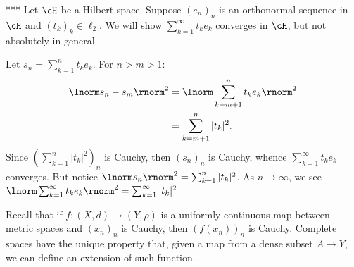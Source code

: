     \begin{example}***
        Let $\cH$ be a Hilbert space. Suppose $(e_n)_n$ is an orthonormal sequence in $\cH$ and $(t_k)_k \in \ell_2$. We will show $\sum_{k = 1}^\infty t_k e_k$ converges in $\cH$, but not absolutely in general.

        Let $s_n = \sum_{k = 1}^n t_k e_k$. For $n>m > 1$:
            \begin{equation*}
            \begin{split}
                \lnorm s_n - s_m \rnorm^2 
                & = \lnorm \sum_{k = m+1}^n t_k e_k \rnorm^2 \\
                & = \sum_{k = m+1}^n |t_k|^2.
            \end{split}
            \end{equation*}
        Since $ \left( \sum_{k = 1}^n |t_k|^2 \right)_n$ is Cauchy, then $(s_n)_n$ is Cauchy, whence $\sum_{k = 1}^\infty t_k e_k$ converges. But notice $\lnorm s_n \rnorm^2 = \sum_{k = 1}^n |t_k|^2$. As $n \rightarrow \infty$, we see $\lnorm \sum_{k = 1}^\infty t_k e_k \rnorm^2 = \sum_{k = 1}^\infty |t_k|^2$.
    \end{example}

    \begin{center}
    \end{center}

    Recall that if $f:(X,d) \rightarrow (Y,\rho)$ is a uniformly continuous map between metric spaces and $(x_n)_n$ is Cauchy, then $(f(x_n))_n$ is Cauchy. Complete spaces have the unique property that, given a map from a dense subset $A \rightarrow Y$, we can define an extension of such function.

